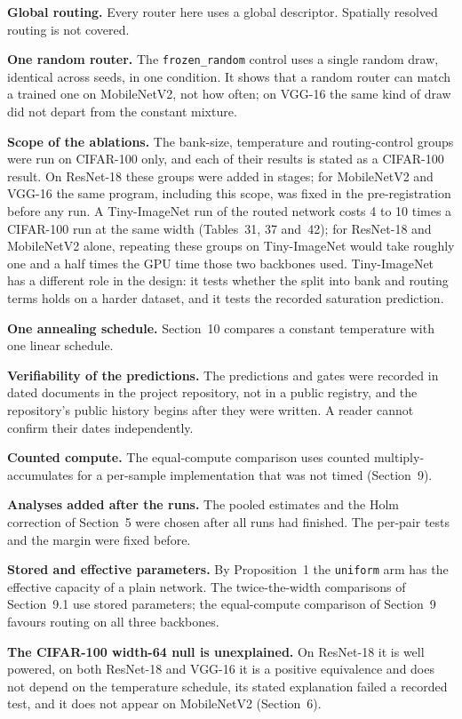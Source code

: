 \documentclass{article}
\begin{document}
\textbf{Global routing.}  Every router here uses a global descriptor.
Spatially resolved routing is not covered.

\textbf{One random router.}  The \texttt{frozen\_random} control uses a
single random draw, identical across seeds, in one condition. It shows that
a random router can match a trained one on MobileNetV2, not how often; on
VGG-16 the same kind of draw did not depart from the constant mixture.

\textbf{Scope of the ablations.}  The bank-size, temperature and
routing-control groups were run on CIFAR-100 only, and each of their
results is stated as a CIFAR-100 result. On ResNet-18 these groups were
added in stages; for MobileNetV2 and VGG-16 the same program, including
this scope, was fixed in the pre-registration before any run. A
Tiny-ImageNet run of the routed network costs 4 to 10 times a CIFAR-100
run at the same width (Tables~31, 37
and~42); for ResNet-18 and MobileNetV2 alone, repeating
these groups on Tiny-ImageNet would take roughly one and a half times the
GPU time those two backbones used. Tiny-ImageNet has a different role in
the design: it tests whether the split into bank and routing terms holds
on a harder dataset, and it tests the recorded saturation prediction.

\textbf{One annealing schedule.}  Section~10 compares a
constant temperature with one linear schedule.

\textbf{Verifiability of the predictions.}  The predictions and gates
were recorded in dated documents in the project repository, not in a
public registry, and the repository's public history begins after they
were written. A reader cannot confirm their dates independently.

\textbf{Counted compute.}  The equal-compute comparison uses counted
multiply-accumulates for a per-sample implementation that was not timed
(Section~9).

\textbf{Analyses added after the runs.}  The pooled estimates and the
Holm correction of Section~5 were chosen after all runs had
finished. The per-pair tests and the margin were fixed before.

\textbf{Stored and effective parameters.}  By
Proposition~1 the \texttt{uniform} arm has the effective
capacity of a plain network. The twice-the-width comparisons of
Section~9.1 use stored parameters; the equal-compute
comparison of Section~9 favours routing on all three
backbones.

\textbf{The CIFAR-100 width-64 null is unexplained.}  On ResNet-18 it is
well powered, on both ResNet-18 and VGG-16 it is a positive equivalence
and does not depend on the temperature schedule, its stated explanation
failed a recorded test, and it does not appear on MobileNetV2
(Section~6).
\end{document}

